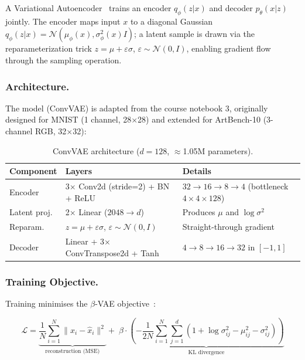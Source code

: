 \documentclass[runningheads]{llncs}
\begin{document}
A Variational Autoencoder~\cite{kingma2013} trains an encoder $q_\phi(z|x)$
and decoder $p_\theta(x|z)$ jointly. The encoder maps input $x$ to a diagonal
Gaussian $q_\phi(z|x)=\mathcal{N}(\mu_\phi(x),\sigma^2_\phi(x)I)$; a latent
sample is drawn via the reparameterization trick $z=\mu+\varepsilon\sigma$,
$\varepsilon\sim\mathcal{N}(0,I)$, enabling gradient flow through the sampling
operation.

\subsubsection{Architecture.}

The model (ConvVAE) is adapted from the course notebook 3, originally designed for MNIST (1 channel, 28$\times$28) and extended for ArtBench-10 (3-channel RGB, 32$\times$32):

\begin{table}[htbp]
\caption{ConvVAE architecture ($d=128$, $\approx$1.05M parameters).}\label{tab:vae_arch}
\centering
\begin{tabular}{p{2cm}p{5cm}p{4.5cm}}
\toprule
Component & Layers & Details \\
\midrule
Encoder        & 3$\times$ Conv2d (stride=2) + BN + ReLU     & $32{\to}16{\to}8{\to}4$ (bottleneck $4{\times}4{\times}128$) \\
Latent proj.\ & 2$\times$ Linear ($2048{\to}d$)              & Produces $\mu$ and $\log\sigma^2$ \\
Reparam.\ & $z=\mu+\varepsilon\sigma$, $\varepsilon\sim\mathcal{N}(0,I)$ & Straight-through gradient \\
Decoder        & Linear + 3$\times$ ConvTranspose2d + Tanh   & $4{\to}8{\to}16{\to}32$ in $[-1,1]$ \\
\bottomrule
\end{tabular}
\end{table}

\subsubsection{Training Objective.}

Training minimises the $\beta$-VAE objective~\cite{higgins2017}:

\begin{equation}
\mathcal{L} = \underbrace{\frac{1}{N}\sum_{i=1}^{N} \|x_i - \hat{x}_i\|^2}_{\text{reconstruction (MSE)}}
+ \;\beta \cdot \underbrace{\left(-\frac{1}{2N}\sum_{i=1}^{N}\sum_{j=1}^{d}\!\left(1 + \log\sigma_{ij}^2 - \mu_{ij}^2 - \sigma_{ij}^2\right)\right)}_{\text{KL divergence}}
\label{eq:bvae}
\end{equation}
\end{document}
